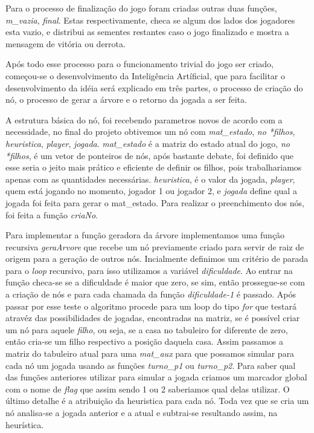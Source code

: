 \documentclass[a4paper, 12pt]{article}
\begin{document}
		
		
		\textrm{Para o processo de finalização do jogo foram criadas outras duas funções, \emph{m_vazia}, \emph{final}. Estas respectivamente, checa se algum dos lados dos jogadores esta vazio, e distribui as sementes restantes caso o jogo finalizado e mostra a mensagem de vitória ou derrota.}

		\textrm{Após todo esse processo para o funcionamento trivial do jogo ser criado, começou-se o desenvolvimento da Inteligência Artíficial, que para facilitar o desenvolvimento da idéia será explicado em três partes, o processo de criação do nó, o processo de gerar a árvore e o retorno da jogada a ser feita.}
		
		\textrm{A estrutura básica do nó, foi recebendo parametros novos de acordo com a necessidade, no final do projeto obtivemos um nó com \emph{mat_estado}, \emph{no *filhos}, \emph{heuristica}, \emph{player}, \emph{jogada}. \emph{mat_estado} é a matriz do estado atual do jogo, \emph{no *filhos}, é um vetor de ponteiros de nós, após bastante debate, foi definido que esse seria o jeito mais prático e eficiente de definir os filhos, pois trabalhariamos apenas com as quantidades necessárias. \emph{heuristica}, é o valor da jogada, \emph{player}, quem está jogando no momento, jogador 1 ou jogador 2, e \emph{jogada} define qual a jogada foi feita para gerar o mat_estado. Para realizar o preenchimento dos nós, foi feita a função \emph{criaNo}.}
	
		\textrm{Para implementar a função geradora da árvore implementamos uma função recursiva \emph{geraArvore} que recebe um nó previamente criado para servir de raiz de origem para a geração de outros nós. Incialmente definimos um critério de parada para o \emph{loop} recursivo, para isso utilizamos a variável \emph{dificuldade}. Ao entrar na função checa-se se a dificuldade é maior que zero, se sim, então prossegue-se com a criação de nós e para cada chamada da função \emph{dificuldade-1} é passado. Após passar por esse teste o algoritmo procede para um loop do tipo \emph{for} que testará atravéz das possibilidades de jogadas, encontradas na matriz, se é possível criar um nó para aquele \emph{filho}, ou seja, se a casa no tabuleiro for diferente de zero, então cria-se um filho respectivo a posição daquela casa. Assim passamos a matriz do tabuleiro atual para uma \emph{mat_aux} para que possamos simular para cada nó um jogada usando as funções \emph{turno_p1} ou \emph{turno_p2}. Para saber qual das funções anteriores utilizar para simular a jogada criamos um marcador global com o nome de \emph{flag} que assim sendo 1 ou 2 saberiamos qual delas utilizar. O último detalhe é a atribuição da heuristica para cada nó. Toda vez que se cria um nó analisa-se a jogada anterior e a atual e subtrai-se resultando assim, na heurística.} %
		
\end{document}

